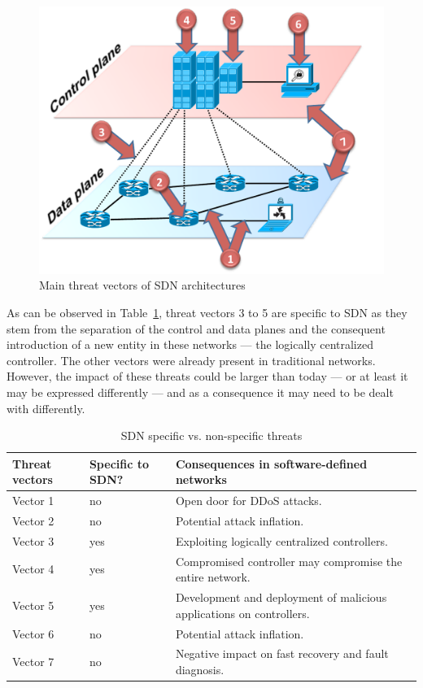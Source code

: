 \begin{figure}[t!]
\centering
\includegraphics[width=0.85\columnwidth]{figures/fig9_sdn_threat_vectors.pdf}
\caption{Main threat vectors of SDN architectures}
\label{fig:threatvectorsmap}
\end{figure}

As can be observed in Table~\ref{tab:newandoldproblems}, threat vectors 3 to 5 are specific to SDN as they 
stem from the separation of the control and data planes and the consequent introduction of a new entity in 
these networks --- the logically centralized controller. The other vectors were already present 
in traditional networks. However, the impact of these threats could be larger than today --- or at least it 
may be expressed differently --- and as a consequence it may need to be dealt with differently.


{\renewcommand{\arraystretch}{1.4}
\begin{table}[!ht]
\caption{SDN specific vs. non-specific threats}
\label{tab:newandoldproblems}
\begin{center}
\footnotesize
\begin{tabularx}{\linewidth}{p{1.2cm}p{1.2cm}X}
\hline
\textbf{Threat vectors}  & \textbf{Specific to SDN?}  & \textbf{Consequences in software-defined networks} \\\hline
Vector 1      & no      & Open door for DDoS attacks.\\\hline
Vector 2      & no      & Potential attack inflation.\\\hline
Vector 3      & yes     & Exploiting logically centralized controllers.\\\hline
Vector 4      & yes     & Compromised controller may compromise the entire network.\\\hline
Vector 5      & yes     & Development and deployment of malicious applications on controllers. \\\hline
Vector 6      & no      & Potential attack inflation.\\\hline
Vector 7      & no      & Negative impact on fast recovery and fault diagnosis.\\
\hline
\end{tabularx}
\end{center}
\end{table}
}

